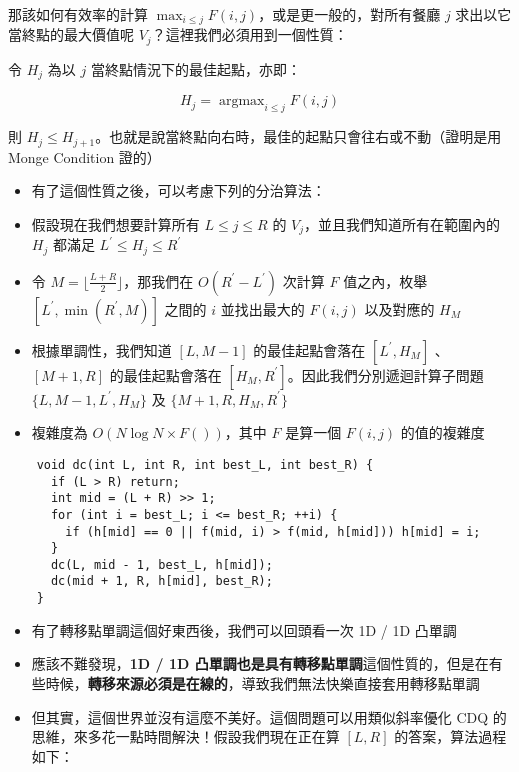 \documentclass[standalone]{beamer}
\begin{document}
\begin{frame}{}
  那該如何有效率的計算 $\max_{i \leq j}F(i, j)$，或是更一般的，對所有餐廳 $j$ 求出以它當終點的最大價值呢 $V_j$？這裡我們必須用到一個性質：
  \begin{theorem}[性質]
    令 $H_j$ 為以 $j$ 當終點情況下的最佳起點，亦即：

    \[ H_j = \mathop{\arg\max}_{i \leq j}F(i, j) \]

    則 $H_j \leq H_{j + 1}$。也就是說當終點向右時，最佳的起點只會往右或不動（證明是用 Monge Condition 證的）
  \end{theorem}
\end{frame}

\begin{frame}{}
\begin{itemize}
  \item 有了這個性質之後，可以考慮下列的分治算法：
  \item 假設現在我們想要計算所有 $L \leq j \leq R$ 的 $V_j$，並且我們知道所有在範圍內的 $H_j$ 都滿足 $L^\prime \leq H_j \leq R^\prime$ 
  \item 令 $M = \lfloor\frac{L + R}{2}\rfloor$，那我們在 $O(R^\prime - L^\prime)$ 次計算 $F$ 值之內，枚舉 $[L^\prime, \min(R^\prime, M)]$ 之間的 $i$ 並找出最大的 $F(i, j)$ 以及對應的 $H_M$
  \item 根據單調性，我們知道 $[L, M - 1]$ 的最佳起點會落在 $[L^\prime, H_M]$ 、 $[M + 1, R]$ 的最佳起點會落在 $[H_M, R^\prime]$。因此我們分別遞迴計算子問題 $\{L, M - 1, L^\prime, H_M\}$ 及 $\{M + 1, R, H_M, R^\prime\}$
  \item 複雜度為 $O(N \log N \times F())$，其中 $F$ 是算一個 $F(i, j)$ 的值的複雜度
\end{itemize}
\end{frame}

\begin{frame}[fragile]{}
  \begin{verbatim}
    void dc(int L, int R, int best_L, int best_R) {
      if (L > R) return;
      int mid = (L + R) >> 1;
      for (int i = best_L; i <= best_R; ++i) {
        if (h[mid] == 0 || f(mid, i) > f(mid, h[mid])) h[mid] = i;
      }
      dc(L, mid - 1, best_L, h[mid]);
      dc(mid + 1, R, h[mid], best_R);
    }
  \end{verbatim}
\end{frame}

\begin{frame}{}
  \begin{itemize}
    \item 有了轉移點單調這個好東西後，我們可以回頭看一次 1D / 1D 凸單調
    \item 應該不難發現，\textbf{1D / 1D 凸單調也是具有轉移點單調}這個性質的，但是在有些時候，\textbf{轉移來源必須是在線的}，導致我們無法快樂直接套用轉移點單調
    \item 但其實，這個世界並沒有這麼不美好。這個問題可以用類似斜率優化 CDQ 的思維，來多花一點時間解決！假設我們現在正在算 $[L, R]$ 的答案，算法過程如下：
  \end{itemize}
\end{frame}
\end{document}
